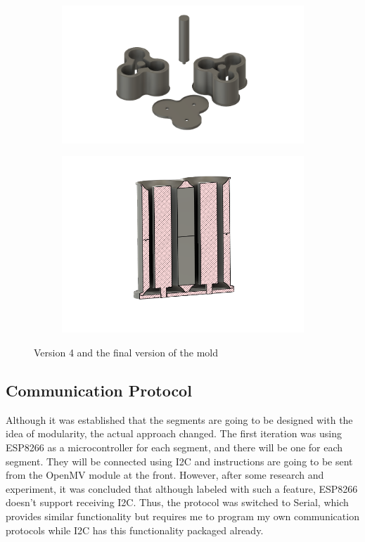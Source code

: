 \documentclass[twoside]{article}
\begin{document}
\begin{figure} [H]
\centering
\begin{subfigure}[b]{0.5\linewidth}
		\centering
		\includegraphics[width=\textwidth]{mold_v4}
	\end{subfigure}%
	\begin{subfigure}[b]{0.5\linewidth}
		\centering		
		\includegraphics[width=\textwidth]{assembled_v4}
	\end{subfigure}
\caption{Version 4 and the final version of the mold}
\end{figure}

\subsection{Communication Protocol}
Although it was established that the segments are going to be designed with the idea of modularity, the actual approach changed. The first iteration was using ESP8266 as a microcontroller for each segment, and there will be one for each segment. They will be connected using I2C and instructions are going to be sent from the OpenMV module at the front. However, after some research and experiment, it was concluded that although labeled with such a feature, ESP8266 doesn’t support receiving I2C. Thus, the protocol was switched to Serial, which provides similar functionality but requires me to program my own communication protocols while I2C has this functionality packaged already.
\end{document}
